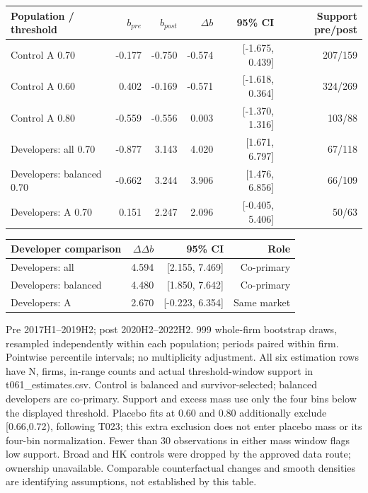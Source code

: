 \begingroup\small
\begin{tabular}{lrrrrr}
\toprule
Population / threshold & $b_{pre}$ & $b_{post}$ & $\Delta b$ & 95\% CI & Support pre/post \\
\midrule
Control A 0.70 & -0.177 & -0.750 & -0.574 & [-1.675, 0.439] & 207/159 \\
Control A 0.60 & 0.402 & -0.169 & -0.571 & [-1.618, 0.364] & 324/269 \\
Control A 0.80 & -0.559 & -0.556 & 0.003 & [-1.370, 1.316] & 103/88 \\
Developers: all 0.70 & -0.877 & 3.143 & 4.020 & [1.671, 6.797] & 67/118 \\
Developers: balanced 0.70 & -0.662 & 3.244 & 3.906 & [1.476, 6.856] & 66/109 \\
Developers: A 0.70 & 0.151 & 2.247 & 2.096 & [-0.405, 5.406] & 50/63 \\
\bottomrule
\end{tabular}
\par\medskip
\begin{tabular}{lrrr}
\toprule
Developer comparison & $\Delta\Delta b$ & 95\% CI & Role \\
\midrule
Developers: all & 4.594 & [2.155, 7.469] & Co-primary \\
Developers: balanced & 4.480 & [1.850, 7.642] & Co-primary \\
Developers: A & 2.670 & [-0.223, 6.354] & Same market \\
\bottomrule
\end{tabular}
\par\footnotesize Pre 2017H1--2019H2; post 2020H2--2022H2. 999 whole-firm bootstrap draws, resampled independently within each population; periods paired within firm. Pointwise percentile intervals; no multiplicity adjustment. All six estimation rows have N, firms, in-range counts and actual threshold-window support in t061\_estimates.csv. Control is balanced and survivor-selected; balanced developers are co-primary. Support and excess mass use only the four bins below the displayed threshold. Placebo fits at 0.60 and 0.80 additionally exclude [0.66,0.72), following T023; this extra exclusion does not enter placebo mass or its four-bin normalization. Fewer than 30 observations in either mass window flags low support. Broad and HK controls were dropped by the approved data route; ownership unavailable. Comparable counterfactual changes and smooth densities are identifying assumptions, not established by this table.
\endgroup
